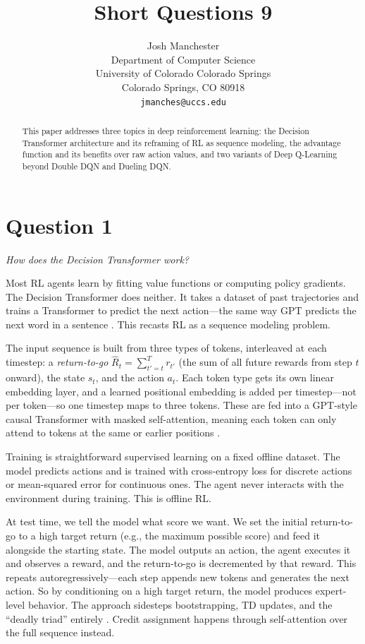 \documentclass[letterpaper]{article}
\title{Short Questions 9}
\author{
    Josh Manchester\\
    Department of Computer Science\\
    University of Colorado Colorado Springs\\
    Colorado Springs, CO 80918\\
    \texttt{jmanches@uccs.edu}
}
\begin{document}
\maketitle

\begin{abstract}
This paper addresses three topics in deep reinforcement learning: the Decision Transformer architecture and its reframing of RL as sequence modeling, the advantage function and its benefits over raw action values, and two variants of Deep Q-Learning beyond Double DQN and Dueling DQN.
\end{abstract}

\section*{Question 1}
\textit{How does the Decision Transformer work?}

\vspace{0.5em}

Most RL agents learn by fitting value functions or computing policy gradients. The Decision Transformer does neither. It takes a dataset of past trajectories and trains a Transformer to predict the next action---the same way GPT predicts the next word in a sentence \citep{chen2021decision}. This recasts RL as a sequence modeling problem.

The input sequence is built from three types of tokens, interleaved at each timestep: a \textit{return-to-go} $\hat{R}_t = \sum_{t'=t}^{T} r_{t'}$ (the sum of all future rewards from step $t$ onward), the state $s_t$, and the action $a_t$. Each token type gets its own linear embedding layer, and a learned positional embedding is added per timestep---not per token---so one timestep maps to three tokens. These are fed into a GPT-style causal Transformer with masked self-attention, meaning each token can only attend to tokens at the same or earlier positions \citep{chen2021decision}.

Training is straightforward supervised learning on a fixed offline dataset. The model predicts actions and is trained with cross-entropy loss for discrete actions or mean-squared error for continuous ones. The agent never interacts with the environment during training. This is offline RL.

At test time, we tell the model what score we want. We set the initial return-to-go to a high target return (e.g., the maximum possible score) and feed it alongside the starting state. The model outputs an action, the agent executes it and observes a reward, and the return-to-go is decremented by that reward. This repeats autoregressively---each step appends new tokens and generates the next action. So by conditioning on a high target return, the model produces expert-level behavior. The approach sidesteps bootstrapping, TD updates, and the ``deadly triad'' entirely \citep{chen2021decision}. Credit assignment happens through self-attention over the full sequence instead.
\end{document}
